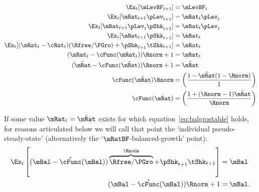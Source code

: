 \documentclass[\econtexRoot/BufferStockTheory]{subfiles}
\begin{document}
\begin{equation}\begin{gathered}\begin{aligned}
  \Ex_{t}[\mLevBF_{t+1}] & =\mLevBF_{t}
  \\\Ex_{t}[\mRat_{t+1}\pLev_{t+1}] & =\mRat_{t} \pLev_{t}
  \\\Ex_{t}[\mRat_{t+1}\pLev_{t}\pShk_{t+1}] & =\mRat_{t} \pLev_{t}
  \\\Ex_{t}[\mRat_{t+1}\pShk_{t+1}] & =\mRat_{t}
  \\\Ex_{t}[(\mRat_{t}-\cRat_{t})(\Rfree/\PGro)+\pShk_{t+1}\tShk_{t+1}] & =\mRat_{t}
  \\(\mRat_{t}-\cFunc(\mRat_{t}))\Rnorm+1 & =\mRat_{t}
  \\(\tilde{\mRat}-\cFunc(\tilde{\mRat}))\Rnorm+1 & =\tilde{\mRat}
  \\\cFunc(\tilde{\mRat})\Rnorm & =\left(\frac{1-\tilde{\mRat}(1-\Rnorm)}{1}\right)
  \\\cFunc(\tilde{\mRat}) & =\left(\frac{1+(\Rnorm-1)\tilde{\mRat}}{\Rnorm}\right)
\end{aligned}\end{gathered}\end{equation}


\hypertarget{balgrostableSolve}{}
If some value $\mRat_{t}=\hat{\mRat}$ exists for which equation~\eqref{eq:balgrostable} holds, for reasons articulated below we will call that point the `individual pseudo-steady-state' (alternatively the `$\mRatBF$-balanced-growth' point):
\begin{equation}\begin{gathered}\begin{aligned}
  \Ex_{t}\left[(\mBal-\mathring{\cFunc}(\mBal))\overbrace{\Rfree/\PGro}^{\Rnorm}+\pShk_{t+1}\tShk_{t+1}\right] & = \mBal \notag
\\  (\mBal-\mathring{\cFunc}(\mBal))\Rnorm+ 1 & = \mBal \label{eq:balgrostableSolve}.  
\end{aligned}\end{gathered}\end{equation}
\end{document}
